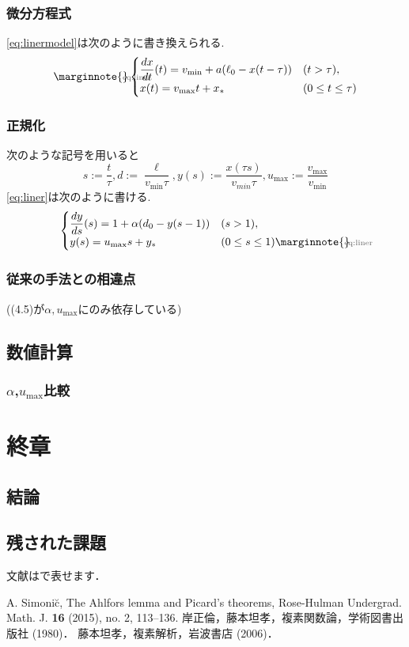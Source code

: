 \documentclass [dvipdfmx] {jsarticle}
\makeatletter
\let\temp@label\label
\def\label#1{\marginnote{\hbox to 0pt{\scriptsize \textcolor{black!60}{#1}\hss}}\temp@label{#1}\ignorespaces}
\numberwithin{equation}{section}
\theoremstyle{definition} %
\theoremstyle{definition} %
\makeatother
\begin{document}
\subsubsection{微分方程式}
\eqref{eq:linermodel}は次のように書き換えられる.
\begin{equation}\label{eq:liner}\begin{cases}
    \displaystyle\frac{dx}{dt}(t)=v_{\min}+a(\ell_0-x(t-\tau)) &(t>\tau),\\
    x(t)=v_{\max}t+x_\ast &(0\le t \le \tau)
\end{cases}\end{equation}
\subsubsection{正規化}
次のような記号を用いると
\begin{equation}
    s:=\displaystyle\frac{t}{\tau},d:=\frac{\ell}{v_{\min}\tau},
    y(s):=\displaystyle\frac{x(\tau s)}{v_{min}\tau},
    u_{\max}:=\displaystyle\frac{v_{\max}}{v_{\min}}
\end{equation}
\eqref{eq:liner}は次のように書ける.
\begin{equation}\begin{cases}
    \displaystyle\frac{dy}{ds}(s)=1+\alpha(d_0-y(s-1)) &(s>1),\\
    y(s)=u_{\max}s+y_\ast &(0\le s \le 1)\label{eq:liner}
\end{cases}\end{equation}
\subsubsection{従来の手法との相違点}
((4.5)が$\alpha,u_{\max}$にのみ依存している)
\subsection{数値計算}
\subsubsection{$\alpha$,$u_{\max}$比較}
\section{終章}
\subsection{結論}
\subsection{残された課題}
文献は\cite{Si}で表せます．
\begin{thebibliography}{9}
 A. Simoni\u{c}, The Ahlfors lemma and Picard's theorems, 
Rose-Hulman Undergrad. Math. J. {\bf 16} (2015), no. 2, 113--136. 
 岸正倫，藤本坦孝，複素関数論，学術図書出版社 (1980)．
 藤本坦孝，複素解析，岩波書店 (2006)．


\end{thebibliography}
\end{document}

